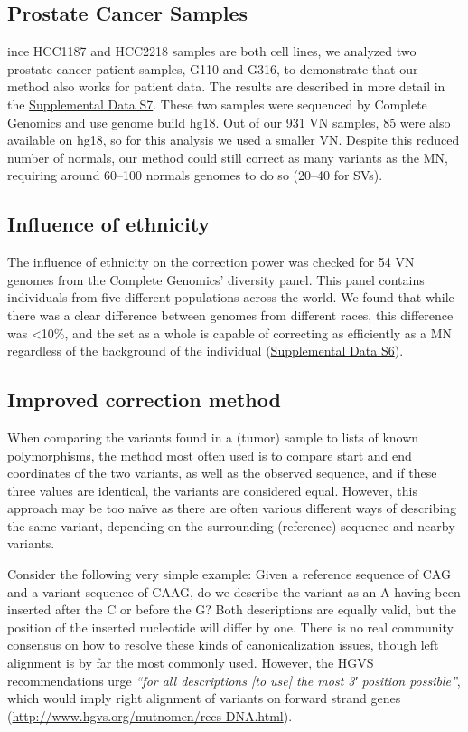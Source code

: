 \subsection*{Prostate Cancer Samples}
ince HCC1187 and HCC2218 samples are both cell lines, we analyzed two prostate cancer patient samples, G110 and G316, to demonstrate that our method also works for patient data. The results are described in more detail in the \href{https://genome.cshlp.org/content/25/9/1382/suppl/DC1}{Supplemental Data S7}. These two samples were sequenced by Complete Genomics and use genome build hg18. Out of our 931 VN samples, 85 were also available on hg18, so for this analysis we used a smaller VN. Despite this reduced number of normals, our method could still correct as many variants as the MN, requiring around 60–100 normals genomes to do so (20–40 for SVs).


\subsection*{Influence of ethnicity}

The influence of ethnicity on the correction power was checked for 54 VN genomes from the Complete Genomics’ diversity panel. This panel contains individuals from five different populations across the world. We found that while there was a clear difference between genomes from different races, this difference was <10\%, and the set as a whole is capable of correcting as efficiently as a MN regardless of the background of the individual (\href{https://genome.cshlp.org/content/25/9/1382/suppl/DC1}{Supplemental Data S6}).

\subsection*{Improved correction method}

When comparing the variants found in a (tumor) sample to lists of known polymorphisms, the method most often used is to compare start and end coordinates of the two variants, as well as the observed sequence, and if these three values are identical, the variants are considered equal. However, this approach may be too naïve as there are often various different ways of describing the same variant, depending on the surrounding (reference) sequence and nearby variants.

Consider the following very simple example: Given a reference sequence of CAG and a variant sequence of CAAG, do we describe the variant as an A having been inserted after the C or before the G? Both descriptions are equally valid, but the position of the inserted nucleotide will differ by one. There is no real community consensus on how to resolve these kinds of canonicalization issues, though left alignment is by far the most commonly used. However, the HGVS recommendations urge \textit{“for all descriptions [to use] the most 3′ position possible”}, which would imply right alignment of variants on forward strand genes (\url{http://www.hgvs.org/mutnomen/recs-DNA.html}).

